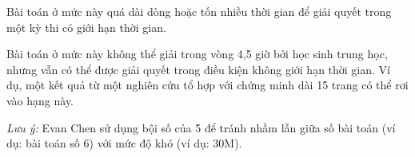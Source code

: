 \documentclass[../imo-training-open-book.tex]{subfiles}
\begin{document}
\begin{definition*}[55M] \label{definition:55M}
    Bài toán ở mức này quá dài dòng hoặc tốn nhiều thời gian để giải quyết trong một kỳ thi có giới hạn thời gian.
\end{definition*}

\begin{definition*}[60M] \label{definition:60M}
    Bài toán ở mức này không thể giải trong vòng 4,5 giờ bởi học sinh trung học, nhưng vẫn có thể được giải quyết trong điều kiện không giới hạn thời gian.
    Ví dụ, một kết quả từ một nghiên cứu tổ hợp với chứng minh dài 15 trang có thể rơi vào hạng này.
\end{definition*}

\textit{Lưu ý:} Evan Chen sử dụng bội số của 5 để tránh nhầm lẫn giữa số bài toán (ví dụ: bài toán số 6) với mức độ khó (ví dụ: 30M).
\end{document}
